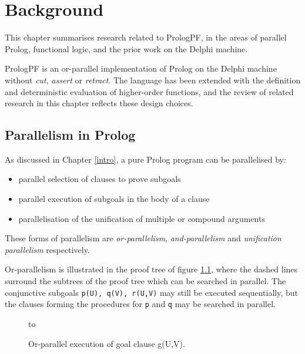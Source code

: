 \chapter{Background}
\label{background}

This chapter summarises research related to PrologPF, in the areas of
parallel Prolog, functional logic, and the prior work on the
Delphi machine.

PrologPF is an or-parallel implementation of Prolog
on the Delphi machine without \textit{cut},
\textit{assert} or \textit{retract}.
The language has been extended with the definition and deterministic evaluation
of higher-order functions, and the review of related research in this 
chapter reflects these design choices.

\section{Parallelism in Prolog} %


As discussed in Chapter \ref{intro}, a pure Prolog program can be
parallelised by:
\begin{itemize}
\item{parallel selection of clauses to prove subgoals}
\item{parallel execution of subgoals in the body of a clause}
\item{parallelisation of the unification of multiple or compound arguments}
\end{itemize}

These forms of parallelism are \textit{or-parallelism}, \textit{and-parallelism}
and \textit{unification parallelism} respectively.

Or-parallelism is illustrated in the proof tree of figure \ref{or_parallelism}, where
the dashed lines surround the subtrees of the proof tree which can be searched in
parallel.  The conjunctive subgoals \texttt{p(U), q(V), r(U,V)} may still be
executed sequentially, but the clauses forming the procedures for \texttt{p} and
\texttt{q} may be searched in parallel.

\begin{figure}[h]
\vspace{5mm} \hbox to 
\caption{Or-parallel execution of goal clause g(U,V).}
\vspace{5mm}
\label{or_parallelism}
\end{figure}

